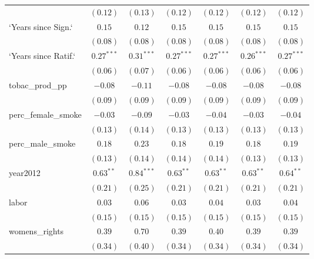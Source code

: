 \begin{table}[!h]
\begin{center}
\begin{tabular}{l c c c c c c }
                        & $(0.12)$      & $(0.13)$      & $(0.12)$      & $(0.12)$      & $(0.12)$     & $(0.12)$      \\
`Years since Sign.`     & $0.15$        & $0.12$        & $0.15$        & $0.15$        & $0.15$       & $0.15$        \\
                        & $(0.08)$      & $(0.08)$      & $(0.08)$      & $(0.08)$      & $(0.08)$     & $(0.08)$      \\
`Years since Ratif.`    & $0.27^{***}$  & $0.31^{***}$  & $0.27^{***}$  & $0.27^{***}$  & $0.26^{***}$ & $0.27^{***}$  \\
                        & $(0.06)$      & $(0.07)$      & $(0.06)$      & $(0.06)$      & $(0.06)$     & $(0.06)$      \\
tobac\_prod\_pp         & $-0.08$       & $-0.11$       & $-0.08$       & $-0.08$       & $-0.08$      & $-0.08$       \\
                        & $(0.09)$      & $(0.09)$      & $(0.09)$      & $(0.09)$      & $(0.09)$     & $(0.09)$      \\
perc\_female\_smoke     & $-0.03$       & $-0.09$       & $-0.03$       & $-0.04$       & $-0.03$      & $-0.04$       \\
                        & $(0.13)$      & $(0.14)$      & $(0.13)$      & $(0.13)$      & $(0.13)$     & $(0.13)$      \\
perc\_male\_smoke       & $0.18$        & $0.23$        & $0.18$        & $0.19$        & $0.18$       & $0.19$        \\
                        & $(0.13)$      & $(0.14)$      & $(0.14)$      & $(0.14)$      & $(0.13)$     & $(0.13)$      \\
year2012                & $0.63^{**}$   & $0.84^{***}$  & $0.63^{**}$   & $0.63^{**}$   & $0.63^{**}$  & $0.64^{**}$   \\
                        & $(0.21)$      & $(0.25)$      & $(0.21)$      & $(0.21)$      & $(0.21)$     & $(0.21)$      \\
labor                   & $0.03$        & $0.06$        & $0.03$        & $0.04$        & $0.03$       & $0.04$        \\
                        & $(0.15)$      & $(0.15)$      & $(0.15)$      & $(0.15)$      & $(0.15)$     & $(0.15)$      \\
womens\_rights          & $0.39$        & $0.70$        & $0.39$        & $0.40$        & $0.39$       & $0.39$        \\
                        & $(0.34)$      & $(0.40)$      & $(0.34)$      & $(0.34)$      & $(0.34)$     & $(0.34)$      \\

\end{tabular}
\end{center}
\end{table}
